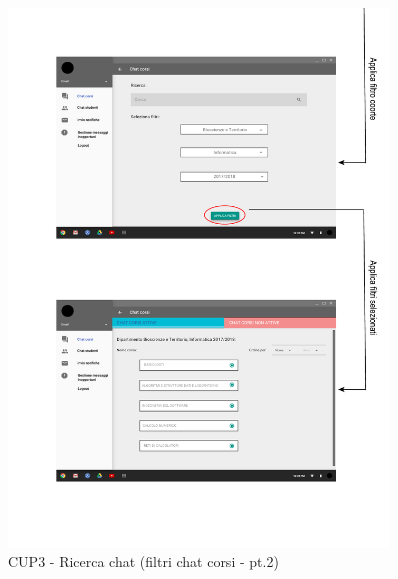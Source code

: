 \begin{figure}
	\centering
	\includegraphics[width=0.9\textwidth]{imgs/gruppo6/activities/act_cup3_filtro_chat_corsi2.pdf}
	\caption{CUP3 - Ricerca chat (filtri chat corsi - pt.2)}
	\label{fig:cup3-2}
\end{figure}

